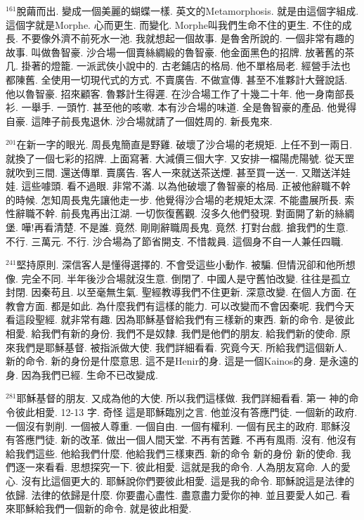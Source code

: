 \documentclass{book}
\begin{document}
$^{161}$脫繭而出.
變成一個美麗的蝴蝶一樣.
英文的Metamorphosis.
就是由這個字組成.
這個字就是Morphe.
心而更生.
而變化.
Morphe叫我們生命不住的更生.
不住的成長.
不要像外濟不前死水一池.
我就想起一個故事.
是魯舍所說的.
一個非常有趣的故事.
叫做魯智豪.
沙合場一個賣絲綢緞的魯智豪.
他金面黑色的招牌.
放著舊的茶几.
掛著的燈籠.
一派武俠小說中的.
古老鋪店的格局.
他不單格局老.
經營手法也都陳舊.
全使用一切現代式的方式.
不賣廣告.
不做宣傳.
甚至不准夥計大聲說話.
他以魯智豪.
招來顧客.
魯夥計生得遲.
在沙合場工作了十幾二十年.
他一身南部長衫.
一舉手.
一頭竹.
甚至他的咳嗽.
本有沙合場的味道.
全是魯智豪的產品.
他覺得自豪.
這陣子前長鬼退休.
沙合場就請了一個姓周的.
新長鬼來.

$^{201}$在新一字的眼光.
周長鬼簡直是野雞.
破壞了沙合場的老規矩.
上任不到一兩日.
就換了一個七彩的招牌.
上面寫著.
大減價三個大字.
又安排一檔陽虎陽號.
從天罡就吹到三間.
還送傳單.
賣廣告.
客人一來就送茶送煙.
甚至買一送一.
又贈送洋娃娃.
這些噱頭.
看不過眼.
非常不滿.
以為他破壞了魯智豪的格局.
正被他辭職不幹的時候.
怎知周長鬼先讓他走一步.
他覺得沙合場的老規矩太深.
不能盡展所長.
索性辭職不幹.
前長鬼再出江湖.
一切恢復舊觀.
沒多久他們發現.
對面開了新的絲綢堡.
嘩!再看清楚.
不是誰.
竟然.
剛剛辭職周長鬼.
竟然.
打對台戲.
搶我們的生意.
不行.
三萬元.
不行.
沙合場為了節省開支.
不惜裁員.
這個身不自一人兼任四職.

$^{241}$堅持原則.
深信客人是懂得選擇的.
不會受這些小動作.
被騙.
但情況卻和他所想像.
完全不同.
半年後沙合場就沒生意.
倒閉了.
中國人是守舊怕改變.
往往是孤立封閉.
因秦苟且.
以至毫無生氣.
聖經教導我們不住更新.
深意改變.
在個人方面.
在教會方面.
都是如此.
為什麼我們有這樣的能力.
可以改變而不會因秦呢.
我們今天看這段聖經.
就非常有趣.
因為耶穌基督給我們有三樣新的東西.
新的命令.
是彼此相愛.
給我們有新的身份.
我們不是奴隸.
我們是他們的朋友.
給我們新的使命.
原來我們是耶穌基督.
被指派做大使.
我們詳細看看.
究竟今天.
所給我們這個新人.
新的命令.
新的身份是什麼意思.
這不是Henir的身.
這是一個Kainos的身.
是永遠的身.
因為我們已經.
生命不已改變成.

$^{281}$耶穌基督的朋友.
又成為他的大使.
所以我們這樣做.
我們詳細看看.
第一 神的命令彼此相愛.
12-13 字.
奇怪 這是耶穌臨別之言.
他並沒有答應門徒.
一個新的政府.
一個沒有剝削.
一個被人尊重.
一個自由.
一個有權利.
一個有民主的政府.
耶穌沒有答應門徒.
新的改革.
做出一個人間天堂.
不再有苦難.
不再有風雨.
沒有.
他沒有給我們這些.
他給我們什麼.
他給我們三樣東西.
新的命令 新的身份 新的使命.
我們逐一來看看.
思想探究一下.
彼此相愛.
這就是我的命令.
人為朋友寫命.
人的愛心.
沒有比這個更大的.
耶穌說你們要彼此相愛.
這是我的命令.
耶穌說這是法律的依歸.
法律的依歸是什麼.
你要盡心盡性.
盡意盡力愛你的神.
並且要愛人如己.
看來耶穌給我們一個新的命令.
就是彼此相愛.
\end{document}
